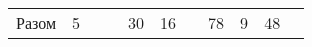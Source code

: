 \begin{table}[h]
\begin{center}
\begin{tabular}{c@{  } c@{  } c@{  } c@{  } c@{  } c@{  } c@{  } c@{  } c@{  } c@{  } с}
     \cmidrule(r){2-2}
     \cmidrule(r){5-5}
     \cmidrule(r){6-6}
     \cmidrule(r){8-8}
     \cmidrule(r){9-9}
     \cmidrule(r){10-10}

      Разом & 5 & & & 30 & 16 & & 78 & 9 & 48 & \\
  \end{tabular}

  \end{center}
\end{table}

